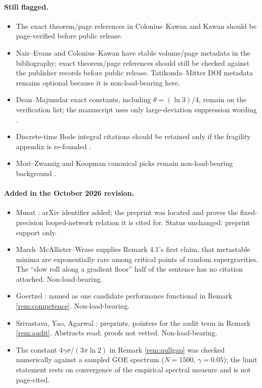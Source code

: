 \documentclass[11pt]{article}
\theoremstyle{definition}
\theoremstyle{remark}
\begin{document}
\paragraph{Still flagged.}
\begin{itemize}
\item The exact theorem/page references in Colonius--Kawan and Kawan should be page-verified before public release.
\item Nair--Evans and Colonius--Kawan have stable volume/page metadata in the bibliography; exact theorem/page references should still be checked against the publisher records before public release. Tatikonda--Mitter DOI metadata remains optional because it is non-load-bearing here.
\item Dean--Majumdar exact constants, including $\theta=(\ln3)/4$, remain on the verification list; the manuscript uses only large-deviation suppression wording \cite{dean2006}.
\item Discrete-time Bode integral citations should be retained only if the fragility appendix is re-founded \cite{mohtadi1990}.
\item Mori--Zwanzig and Koopman canonical picks remain non-load-bearing background \cite{zwanzig1961,mori1965,koopman1931}.
\end{itemize}

\paragraph{Added in the October 2026 revision.}
\begin{itemize}
\item Musat \cite{musat2026}: arXiv identifier added; the preprint was located and proves the fixed-precision looped-network relation it is cited for. Status unchanged: preprint support only.
\item Marsh--McAllister--Wrase \cite{marsh2012} supplies Remark 4.1's first claim, that metastable minima are exponentially rare among critical points of random supergravities. The ``slow roll along a gradient floor'' half of the sentence has no citation attached. Non-load-bearing.
\item Goertzel \cite{goertzel2010}: named as one candidate performance functional in Remark \ref{rem:competence}. Non-load-bearing.
\item Srivastava, Yao, Agarwal \cite{srivastava2026,yao2025trap,agarwal2026}: preprints, pointers for the audit term in Remark \ref{rem:audit}. Abstracts read; proofs not vetted. Non-load-bearing.
\item The constant $4\gamma\sigma/(3\pi\ln2)$ in Remark \ref{rem:nullgap} was checked numerically against a sampled GOE spectrum ($N=1500$, $\gamma=0.05$); the limit statement rests on convergence of the empirical spectral measure and is not page-cited.
\end{itemize}
\end{document}
